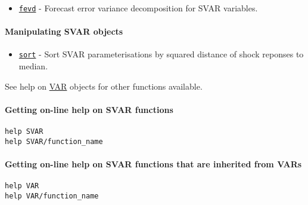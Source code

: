 \begin{itemize}
\itemsep1pt\parskip0pt
\item
  \href{SVAR/fevd}{\texttt{fevd}} - Forecast error variance
  decomposition for SVAR variables.
\end{itemize}

\paragraph{Manipulating SVAR objects}\label{manipulating-svar-objects}

\begin{itemize}
\itemsep1pt\parskip0pt
\item
  \href{SVAR/sort}{\texttt{sort}} - Sort SVAR parameterisations by
  squared distance of shock reponses to median.
\end{itemize}

See help on \href{VAR/Contents}{VAR} objects for other functions
available.

\paragraph{Getting on-line help on SVAR
functions}\label{getting-on-line-help-on-svar-functions}

\begin{verbatim}
help SVAR
help SVAR/function_name
\end{verbatim}

\paragraph{Getting on-line help on SVAR functions that are inherited
from
VARs}\label{getting-on-line-help-on-svar-functions-that-are-inherited-from-vars}

\begin{verbatim}
help VAR
help VAR/function_name
\end{verbatim}



